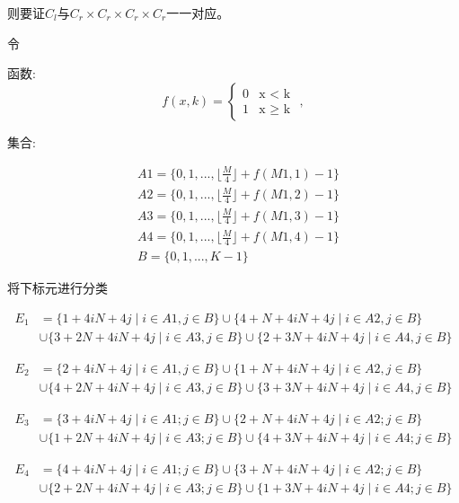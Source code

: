 \documentclass{amsc}          %
\numberwithin{equation}{section} %
\begin{document}
\begin{prof}
则要证$C_{l}$与$C_{r} \times C_{r}\times C_{r} \times C_{r} $一一对应。

令

函数:
$$f(x,k)=
\begin{cases}
0& \text{x $<$ k }\\
1& \text{x $\geq$ k}
\end{cases},$$

集合:

\begin{align*}
&A1 = \{0,1,...,\lfloor \frac{M}{4} \rfloor + f(M1,1) -1\}\\
&A2 = \{0,1,...,\lfloor \frac{M}{4} \rfloor + f(M1,2) -1\}\\
&A3 = \{0,1,...,\lfloor \frac{M}{4} \rfloor + f(M1,3) -1\}\\
&A4 = \{0,1,...,\lfloor \frac{M}{4} \rfloor + f(M1,4) -1\}\\
&B=\{0,1,...,K-1\}
\end{align*}

将下标元进行分类


\begin{displaymath}
\begin{split}
E_{1} &=\{1+4iN+4j \mid i \in A1,j \in B\}\cup\{4+N+4iN+4j \mid i\in A2,j \in B\}\\
&\cup\{3+2N+4iN+4j \mid i\in A3,j \in B\}\cup\{2+3N+4iN+4j \mid i\in A4,j \in B\}
\end{split}
\end{displaymath}

\begin{displaymath}
\begin{split}
E_{2} &=\{2+4iN+4j \mid i \in A1,j \in B\} \cup\{1+N+4iN+4j \mid i \in A2,j \in B\} \\
&\cup\{4+2N+4iN+4j \mid i \in A3,j \in B\}  \cup\{3+3N+4iN+4j \mid i \in A4,j \in B\}
\end{split}
\end{displaymath}

\begin{displaymath}
\begin{split}
E_{3} &=\{3+4iN+4j \mid i \in A1;j \in B\}  \cup\{2+N+4iN+4j \mid i \in A2; j \in B\} \\
&\cup\{1+2N+4iN+4j \mid i \in A3;j \in B\}  \cup\{4+3N+4iN+4j \mid i \in A4;j \in B\}
\end{split}
\end{displaymath}

\begin{displaymath}
\begin{split}
E_{4} &=\{4+4iN+4j \mid i \in A1;j \in B\}  \cup\{3+N+4iN+4j \mid i \in A2;j \in B\} \\
&\cup\{2+2N+4iN+4j \mid i \in A3;j \in B\}  \cup\{1+3N+4iN+4j \mid i \in A4;j \in B\}
\end{split}
\end{displaymath}



\end{prof}
\end{document}
